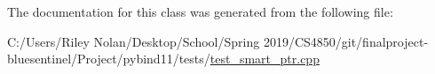 The documentation for this class was generated from the following file\+:\begin{DoxyCompactItemize}
\item 
C\+:/\+Users/\+Riley Nolan/\+Desktop/\+School/\+Spring 2019/\+C\+S4850/git/finalproject-\/bluesentinel/\+Project/pybind11/tests/\mbox{\hyperlink{test__smart__ptr_8cpp}{test\+\_\+smart\+\_\+ptr.\+cpp}}\end{DoxyCompactItemize}
